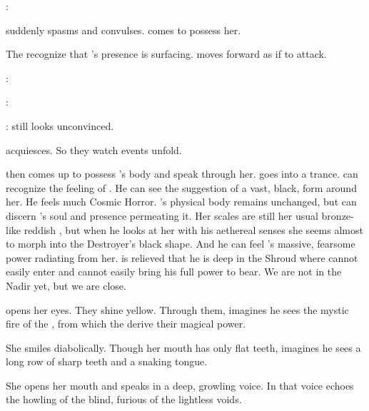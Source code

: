 \Teshrial:



\begin{comment}
  \section{Ishnaruchaefir possesses Criseis}
\end{comment}
\new
\Criseis suddenly spasms and convulses. 
\Ishnaruchaefir comes to possess her.

The \resphain recognize that \Ishnaruchaefir's presence is surfacing. 
\Ganethed moves forward as if to attack.

\Teshrial:

\Ganethed:

\Teshrial:
\Ganethed still looks unconvinced. 

\Ganethed acquiesces.
So they watch events unfold.

\Ishnaruchaefir then comes up to possess \Criseis's body and speak through her.
\Criseis goes into a trance. 
\Teshrial can recognize the feeling of \Ishnaruchaefir.
He can see the suggestion of a vast, black, \draconian form around her. 
He feels much Cosmic Horror. 
\Criseis's physical body remains unchanged, but \Teshrial can discern \Ishnaruchaefir's soul and presence permeating it. 
Her scales are still her usual bronze-like reddish \colour, but when he looks at her with his aethereal senses she seems almost to morph into the Destroyer's black \draconian shape. 
And he can feel \Ishnaruchaefir's massive, fearsome power radiating from her. 
\Teshrial is relieved that he is deep in the Shroud where \Ishnaruchaefir cannot easily enter and cannot easily bring his full power to bear. 
We are not in the Nadir yet, but we are close. 

\Criseis opens her eyes.
They shine yellow. 
Through them, \Teshrial imagines he sees the mystic fire of the \xss, from which the \dragons derive their magical power. 

She smiles diabolically.
Though her mouth has only flat \scathaese teeth, \Teshrial imagines he sees a long row of sharp \draconian teeth and a snaking tongue. 

She opens her mouth and speaks in a deep, growling voice.
In that voice echoes the howling of the blind, furious \daemons of the lightless voids. 

